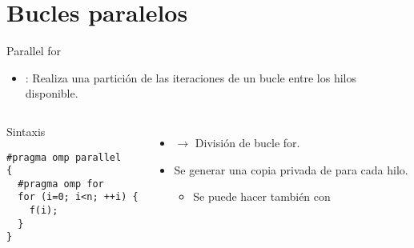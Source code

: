 \section{Bucles paralelos}

\begin{frame}[t,fragile]{Parallel for}
\begin{itemize}
  \item {}: Realiza una partición de las iteraciones de
        un bucle entre los hilos disponible.
\end{itemize}

\begin{columns}[T]

\begin{block}{Sintaxis}
\begin{lstlisting}
#pragma omp parallel
{
  #pragma omp for
  for (i=0; i<n; ++i) {
    f(i);
  }
}
\end{lstlisting}
\end{block}

\begin{itemize}
  \item {} $\rightarrow$ División de bucle for.
  \item Se generar una copia privada de  para cada hilo.
    \begin{itemize}
      \item Se puede hacer también con \cppkey{)}
    \end{itemize}
\end{itemize}

\end{columns}

\end{frame}

